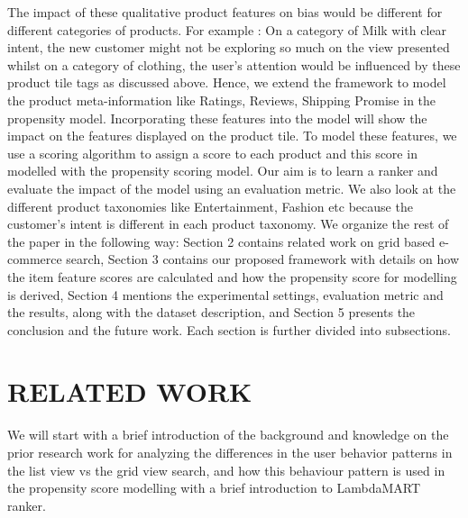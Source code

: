 \documentclass[11pt]{article}
\begin{document}
The impact of these qualitative product features on bias would be different for different categories of products. For example : On a category of Milk with clear intent, the new customer might not be exploring so much on the view presented whilst on a category of clothing, the user's attention would be influenced by these product tile tags as discussed above. Hence, we extend the framework to model the product meta-information like Ratings, Reviews, Shipping Promise in the propensity model. 
Incorporating these features into the model will show the impact on the features displayed on the product tile. To model these features, we use a scoring algorithm to assign a score to each product and this score in modelled with the propensity scoring model. Our aim is to learn a ranker and evaluate the impact of the model using an evaluation metric. We also look at the different product taxonomies like Entertainment, Fashion etc because the customer's intent is different in each product taxonomy. 
\newline
We organize the rest of the paper in the following way: Section 2 contains related work on grid based e-commerce search, Section 3 contains our proposed framework with details on how the item feature scores are calculated and how the propensity score for modelling is derived, Section 4 mentions the experimental settings, evaluation metric and the results, along with the dataset description, and Section 5 presents the conclusion and the future work. Each section is further divided into subsections.

\section{RELATED WORK}
We will start with a brief introduction of the background and knowledge on the prior research work for analyzing the differences in the user behavior patterns in the list view vs the grid view search, and how this behaviour pattern is used in the propensity score modelling with a brief introduction to LambdaMART ranker.
\end{document}
